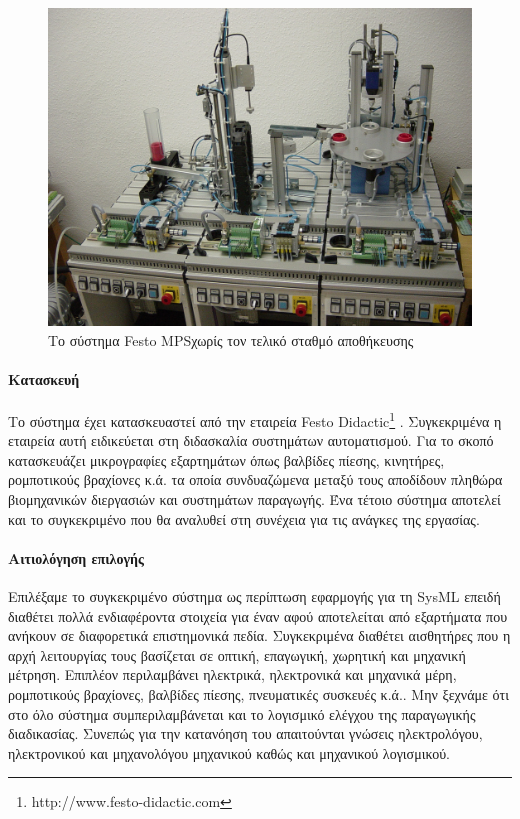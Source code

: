 \documentclass[a4paper,12pt,twoside]{report}
\begin{document}
{			\begin{figure}[hp]
					\centering
					\includegraphics[scale=0.25]{FestoMPSSystem1.png}
					\caption{Το σύστημα Festo MPS\textregistered  χωρίς τον τελικό σταθμό αποθήκευσης \cite{PhotosFestoMPSUniversityHalle}}
					\label{φωτ:Το σύστημα Festo MPS χωρίς τον τελικό σταθμό αποθήκευσης}
			\end{figure}
			
			\paragraph{Κατασκευή} {Το σύστημα έχει κατασκευαστεί από την εταιρεία Festo Didactic\footnote{http://www.festo-didactic.com} . Συγκεκριμένα η εταιρεία αυτή ειδικεύεται στη διδασκαλία συστημάτων αυτοματισμού. Για το σκοπό κατασκευάζει μικρογραφίες εξαρτημάτων όπως βαλβίδες πίεσης, κινητήρες, ρομποτικούς βραχίονες κ.ά. τα οποία συνδυαζώμενα μεταξύ τους αποδίδουν πληθώρα βιομηχανικών διεργασιών και συστημάτων παραγωγής. Ένα τέτοιο σύστημα αποτελεί και το συγκεκριμένο που θα αναλυθεί στη συνέχεια για τις ανάγκες της εργασίας.
			}
			
			\paragraph{Αιτιολόγηση επιλογής} {Επιλέξαμε το συγκεκριμένο σύστημα ως περίπτωση εφαρμογής για τη \acrshort{SysML} επειδή διαθέτει πολλά ενδιαφέροντα στοιχεία για έναν  αφού αποτελείται από εξαρτήματα που ανήκουν σε διαφορετικά επιστημονικά πεδία. Συγκεκριμένα διαθέτει αισθητήρες που η αρχή λειτουργίας τους βασίζεται σε οπτική, επαγωγική, χωρητική και μηχανική μέτρηση. Επιπλέον περιλαμβάνει ηλεκτρικά, ηλεκτρονικά και μηχανικά μέρη, ρομποτικούς βραχίονες, βαλβίδες πίεσης, πνευματικές συσκευές κ.ά.. Μην ξεχνάμε ότι στο όλο σύστημα συμπεριλαμβάνεται και το λογισμικό ελέγχου της παραγωγικής διαδικασίας. Συνεπώς για την κατανόηση του απαιτούνται γνώσεις ηλεκτρολόγου, ηλεκτρονικού και μηχανολόγου μηχανικού καθώς και μηχανικού λογισμικού.
			}
						
}
\end{document}
